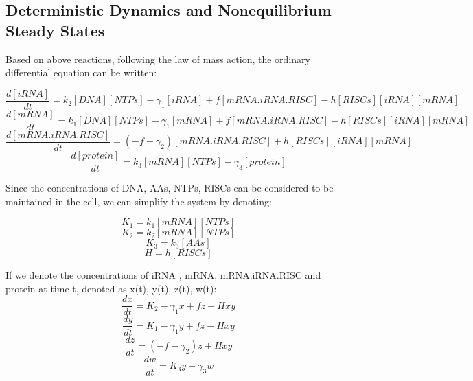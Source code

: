 \documentclass[fleqn,10pt]{wlscirep}
\begin{document}
\subsection*{Deterministic Dynamics and Nonequilibrium Steady States}

Based on above reactions, following the law of mass action, the ordinary differential equation can be written:

\begin{equation}
\frac{d[iRNA]}{dt} = k_2[DNA][NTPs] - \gamma_1[iRNA] + f[mRNA.iRNA.RISC] - h[RISCs][iRNA][mRNA] 
\end{equation}
\begin{equation}
\frac{d[mRNA]}{dt} = k_1[DNA][NTPs] - \gamma_1[mRNA] + f[mRNA.iRNA.RISC] - h[RISCs][iRNA][mRNA]  
\end{equation}
\begin{equation}
\frac{d[mRNA.iRNA.RISC]}{dt} = (- f - \gamma_2)[mRNA.iRNA.RISC] + h[RISCs][iRNA][mRNA] 
\end{equation}
\begin{equation}
\frac{d[protein]}{dt} = k_3[mRNA][NTPs] - \gamma_3[protein]
\end{equation}

Since the concentrations of DNA, AAs, NTPs, RISCs can be considered to be maintained in the cell, we can simplify the system by denoting:

\begin{equation}
K_1 = k_1[mRNA][NTPs]
\end{equation}
\begin{equation}
K_2 = k_2[mRNA][NTPs]
\end{equation}
\begin{equation}
K_3 = k_3[AAs]
\end{equation}
\begin{equation}
H = h[RISCs]
\end{equation}

If we denote the concentrations of iRNA , mRNA, mRNA.iRNA.RISC and protein at time t, denoted as x(t), y(t), z(t), w(t):
\begin{equation}
\frac{dx}{dt} = K_2 - \gamma_1x + fz - Hxy 
\end{equation}
\begin{equation}
\frac{dy}{dt} = K_1 - \gamma_1y + fz - Hxy
\end{equation}
\begin{equation}
\frac{dz}{dt} = (- f - \gamma_2)z + Hxy 
\end{equation}
\begin{equation}
\frac{dw}{dt} = K_3y - \gamma_3w
\end{equation}
\end{document}
